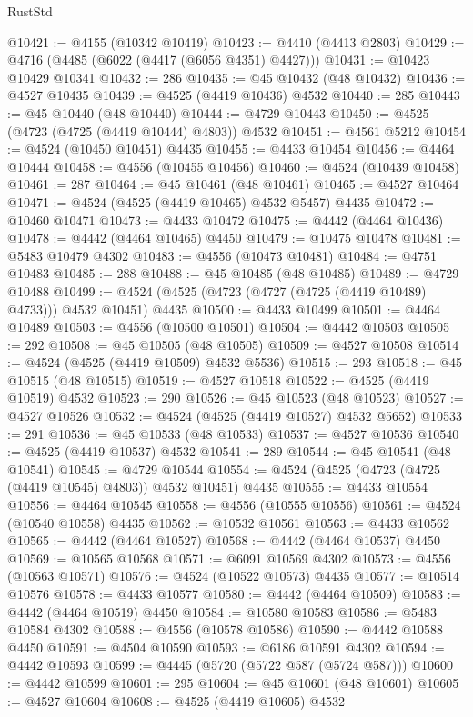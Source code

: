 \begin{lexlean}{RustStd}
\begin{coremodule}
@10421 := @4155 (@10342 @10419)
@10423 := @4410 (@4413 @2803)
@10429 := @4716 (@4485 (@6022 (@4417 (@6056 @4351) @4427)))
@10431 := @10423 @10429 @10341
@10432 := 286
@10435 := @45 @10432 (@48 @10432)
@10436 := @4527 @10435
@10439 := @4525 (@4419 @10436) @4532
@10440 := 285
@10443 := @45 @10440 (@48 @10440)
@10444 := @4729 @10443
@10450 := @4525 (@4723 (@4725 (@4419 @10444) @4803)) @4532
@10451 := @4561 @5212
@10454 := @4524 (@10450 @10451) @4435
@10455 := @4433 @10454
@10456 := @4464 @10444
@10458 := @4556 (@10455 @10456)
@10460 := @4524 (@10439 @10458)
@10461 := 287
@10464 := @45 @10461 (@48 @10461)
@10465 := @4527 @10464
@10471 := @4524 (@4525 (@4419 @10465) @4532 @5457) @4435
@10472 := @10460 @10471
@10473 := @4433 @10472
@10475 := @4442 (@4464 @10436)
@10478 := @4442 (@4464 @10465) @4450
@10479 := @10475 @10478
@10481 := @5483 @10479 @4302
@10483 := @4556 (@10473 @10481)
@10484 := @4751 @10483
@10485 := 288
@10488 := @45 @10485 (@48 @10485)
@10489 := @4729 @10488
@10499 := @4524 (@4525 (@4723 (@4727 (@4725 (@4419 @10489) @4733))) @4532 @10451) @4435
@10500 := @4433 @10499
@10501 := @4464 @10489
@10503 := @4556 (@10500 @10501)
@10504 := @4442 @10503
@10505 := 292
@10508 := @45 @10505 (@48 @10505)
@10509 := @4527 @10508
@10514 := @4524 (@4525 (@4419 @10509) @4532 @5536)
@10515 := 293
@10518 := @45 @10515 (@48 @10515)
@10519 := @4527 @10518
@10522 := @4525 (@4419 @10519) @4532
@10523 := 290
@10526 := @45 @10523 (@48 @10523)
@10527 := @4527 @10526
@10532 := @4524 (@4525 (@4419 @10527) @4532 @5652)
@10533 := 291
@10536 := @45 @10533 (@48 @10533)
@10537 := @4527 @10536
@10540 := @4525 (@4419 @10537) @4532
@10541 := 289
@10544 := @45 @10541 (@48 @10541)
@10545 := @4729 @10544
@10554 := @4524 (@4525 (@4723 (@4725 (@4419 @10545) @4803)) @4532 @10451) @4435
@10555 := @4433 @10554
@10556 := @4464 @10545
@10558 := @4556 (@10555 @10556)
@10561 := @4524 (@10540 @10558) @4435
@10562 := @10532 @10561
@10563 := @4433 @10562
@10565 := @4442 (@4464 @10527)
@10568 := @4442 (@4464 @10537) @4450
@10569 := @10565 @10568
@10571 := @6091 @10569 @4302
@10573 := @4556 (@10563 @10571)
@10576 := @4524 (@10522 @10573) @4435
@10577 := @10514 @10576
@10578 := @4433 @10577
@10580 := @4442 (@4464 @10509)
@10583 := @4442 (@4464 @10519) @4450
@10584 := @10580 @10583
@10586 := @5483 @10584 @4302
@10588 := @4556 (@10578 @10586)
@10590 := @4442 @10588 @4450
@10591 := @4504 @10590
@10593 := @6186 @10591 @4302
@10594 := @4442 @10593
@10599 := @4445 (@5720 (@5722 @587 (@5724 @587)))
@10600 := @4442 @10599
@10601 := 295
@10604 := @45 @10601 (@48 @10601)
@10605 := @4527 @10604
@10608 := @4525 (@4419 @10605) @4532

\end{coremodule}
\end{lexlean}
